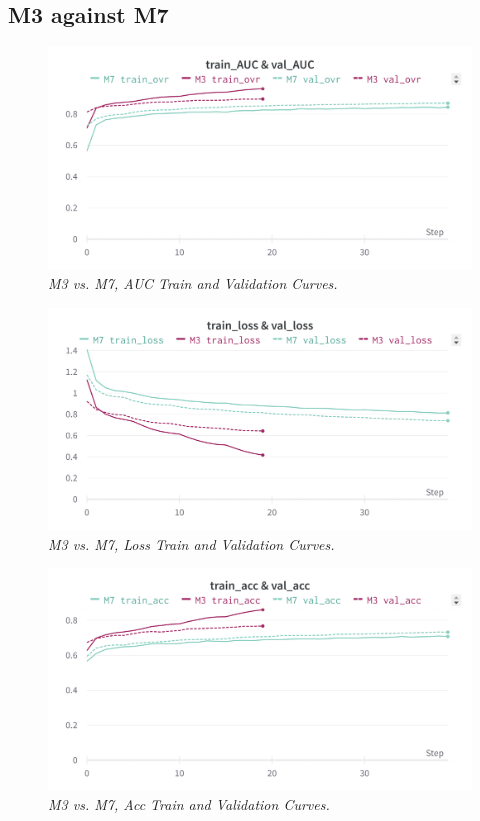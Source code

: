 \newpage

\subsection{M3 against M7}

\begin{figure}[H]
  \centering
  \includegraphics[width=\textwidth]{imatges/results/AUCM3M7.png}
  \caption[M3 vs. M7, AUC Train and Validation Curves]{\textit{M3 vs. M7, AUC Train and Validation Curves. }}
\end{figure}


\begin{figure}[H]
  \centering
  \includegraphics[width=\textwidth]{imatges/results/LossM3M7.png}
  \caption[M3 vs. M7, Loss Train and Validation Curves]{\textit{M3 vs. M7, Loss Train and Validation Curves. }}
\end{figure}

\newpage

\begin{figure}[H]
  \centering
  \includegraphics[width=\textwidth]{imatges/results/AccM3M7.png}
  \caption[M3 vs. M7, Acc Train and Validation Curves]{\textit{M3 vs. M7, Acc Train and Validation Curves. }}
\end{figure}


